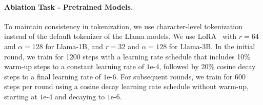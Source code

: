 \paragraph{Ablation Task - Pretrained Models.}
To maintain consistency in tokenization, we use character-level tokenization instead of the default tokenizer of the Llama models. We use LoRA~\citep{Hu2021LoRALA} with $r=64$ and $\alpha=128$ for Llama-1B, and $r=32$ and $\alpha=128$ for Llama-3B. 
In the initial round, we train for 1200 steps with a learning rate schedule that includes 10\% warm-up steps to a constant learning rate of \( 1\text{e-}4 \), followed by 20\% cosine decay steps to a final learning rate of \( 1\text{e-}6 \). For subsequent rounds, we train for 600 steps per round using a cosine decay learning rate schedule without warm-up, starting at \( 1\text{e-}4 \) and decaying to \( 1\text{e-}6 \).
